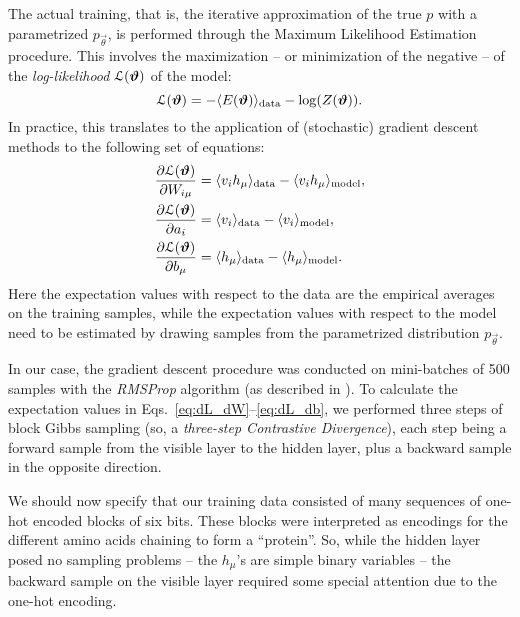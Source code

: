 \documentclass[prl, twocolumn]{revtex4-2}
\begin{document}
The actual training, that is, the iterative approximation of the true $p$
with a parametrized $p_{\vec{\theta}}$, is performed through the Maximum
Likelihood Estimation procedure. This involves the maximization – or
minimization of the negative – of the \emph{log-likelihood}
$\mathcal{L}(\bm{\vartheta})$ of the model:
\begin{equation}
    \mathcal{L}(\bm{\vartheta}) = -\langle E(\bm{\vartheta})\rangle_{\mathrm{data}} -
    \log(Z(\bm{\vartheta})).
\end{equation}
In practice, this translates to the application of (sto\-chas\-tic)
gradient descent methods to the following set
of equations:
\begin{align}
    \pdiff{\logL(\vec{\theta})}{W_{i\mu}} &= \expval{v_i
    h_\mu}_{\mathrm{data}} - \expval{v_i h_\mu}_{\mathrm{model}},
    \label{eq:dL_dW} \\
    \pdiff{\logL(\vec{\theta})}{a_i} &= \expval{v_i}_{\mathrm{data}} -
    \expval{v_i}_{\mathrm{model}}, \label{eq:dL_da} \\
    \pdiff{\logL(\vec{\theta})}{b_\mu} &= \expval{h_\mu}_{\mathrm{data}} -
    \expval{h_\mu}_{\mathrm{model}}. \label{eq:dL_db}
\end{align}
Here the expectation values with respect to the data are the empirical
averages on the training samples, while the expectation values with respect
to the model need to be estimated by drawing samples from the parametrized
distribution $p_{\vec{\theta}}$.

In our case, the gradient descent procedure was conducted on mini-batches
of 500 samples with the \emph{RMSProp} algorithm (as described in
\cite{Mehta2019}). To calculate the expectation values in
Eqs.~\eqref{eq:dL_dW}–\eqref{eq:dL_db}, we performed three steps of block
Gibbs sampling (so, a \emph{three-step Contrastive Divergence}), each step
being a forward sample from the visible layer to the hidden layer, plus a
backward sample in the opposite direction.

We should now specify that our training data consisted of many sequences of
one-hot encoded blocks of six bits. These blocks were interpreted as
encodings for the different amino acids chaining to form a “protein”. So,
while the hidden layer posed no sampling problems – the $h_\mu$’s are
simple binary variables – the backward sample on the visible layer required
some special attention due to the one-hot encoding.
\end{document}
